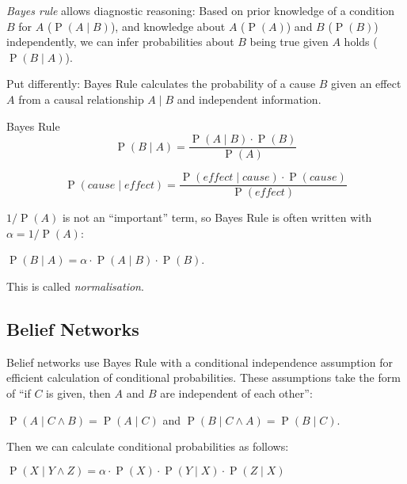 \documentclass[english]{panikzettel}
\begin{document}
\begin{halfboxl}
\emph{Bayes rule} allows diagnostic reasoning:  Based on prior knowledge of a condition $B$ for $A$ (${\operatorname{P}(A \mid B)}$), and knowledge about $A$ ($\operatorname{P}(A)$) and $B$ ($\operatorname{P}(B)$) independently, we can infer probabilities about $B$ being true given $A$ holds ($\operatorname{P}(B \mid A)$).

Put differently: Bayes Rule calculates the probability of a cause $B$ given an effect $A$ from a causal relationship $A \mid B$ and independent information.
\end{halfboxl}%
\begin{halfboxr}
\vspace{-\baselineskip}
\begin{theo}{Bayes Rule}
\[\operatorname{P}(B\mid A) = \frac{\operatorname{P} (A\mid B) \cdot \operatorname{P}(B)} {\operatorname{P}(A)}\]

\footnotesize
\[\operatorname{P}(cause \mid effect) = \frac{\operatorname{P} (effect \mid cause) \cdot \operatorname{P}(cause)} {\operatorname{P}(effect)}\]
\end{theo}
\end{halfboxr}

$1/\operatorname{P}(A)$ is not an ``important'' term, so Bayes Rule is often written with $\alpha = 1/\operatorname{P}(A)$:
\begin{tightcenter}
$\operatorname{P}(B \mid A) = \alpha \cdot \operatorname{P}(A \mid B) \cdot \operatorname{P}(B)$.
\end{tightcenter}
This is called \emph{normalisation}.

\subsection{Belief Networks}

Belief networks use Bayes Rule with a conditional independence assumption for efficient calculation of conditional probabilities.
These assumptions take the form of ``if $C$ is given, then $A$ and $B$ are independent of each other'':
\begin{tightcenter}
$\operatorname{P}(A \mid C \land B) = \operatorname{P}(A \mid C)$ and $\operatorname{P}(B \mid C \land A) = \operatorname{P}(B \mid C)$.
\end{tightcenter}
Then we can calculate conditional probabilities as follows:
\begin{tightcenter}
$\operatorname{P}(X \mid Y \land Z) = \alpha \cdot \operatorname{P}(X) \cdot \operatorname{P}(Y \mid X) \cdot \operatorname{P}(Z \mid X)$
\end{tightcenter}
\bigskip
\end{document}
